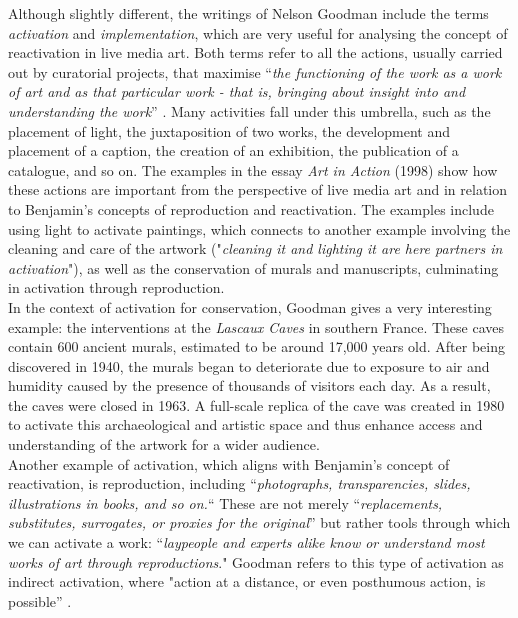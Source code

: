 Although slightly different, the writings of Nelson Goodman \cite{goodman1982implementation, goodman1998art} include the terms \textit{activation} and \textit{implementation}, which are very useful for analysing the concept of reactivation in live media art. Both terms refer to all the actions, usually carried out by curatorial projects, that maximise ``\textit{the functioning of the work as a work of art and as that particular work - that is, bringing about insight into and understanding the work}” \cite{goodman1982implementation}. Many activities fall under this umbrella, such as the placement of light, the juxtaposition of two works, the development and placement of a caption, the creation of an exhibition, the publication of a catalogue, and so on. The examples in the essay \textit{Art in Action} (1998) show how these actions are important from the perspective of live media art and in relation to Benjamin's concepts of reproduction and reactivation. The examples include using light to activate paintings, which connects to another example involving the cleaning and care of the artwork ("\textit{cleaning it and lighting it are here partners in activation}"), as well as the conservation of murals and manuscripts, culminating in activation through reproduction.\\
In the context of activation for conservation, Goodman gives a very interesting example: the interventions at the \textit{Lascaux Caves} in southern France. These caves contain 600 ancient murals, estimated to be around 17,000 years old. After being discovered in 1940, the murals began to deteriorate due to exposure to air and humidity caused by the presence of thousands of visitors each day. As a result, the caves were closed in 1963. A full-scale replica of the cave was created in 1980 to activate this archaeological and artistic space and thus enhance access and understanding of the artwork for a wider audience.\\
Another example of activation, which aligns with Benjamin's concept of reactivation, is reproduction, including ``\textit{photographs, transparencies, slides, illustrations in books, and so on.}`` These are not merely ``\textit{replacements, substitutes, surrogates, or proxies for the original}'' but rather tools through which we can activate a work: ``\textit{laypeople and experts alike know or understand most works of art through reproductions}." Goodman refers to this type of activation as indirect activation, where "{action at a distance, or even posthumous action, is possible}'' \cite{goodman1998art}.\\
